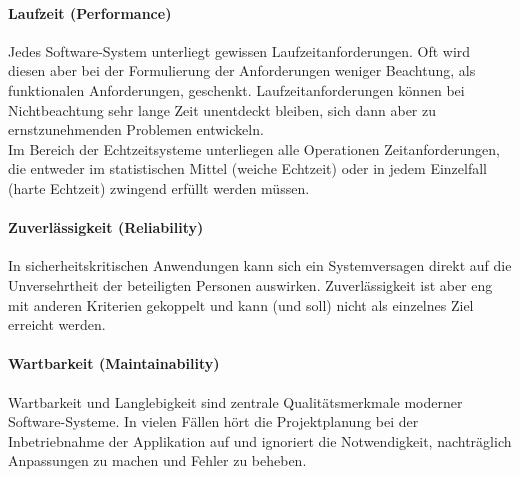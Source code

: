 \paragraph{Laufzeit (Performance)} Jedes Software-System unterliegt gewissen Laufzeitanforderungen. Oft wird diesen aber bei der Formulierung der Anforderungen weniger Beachtung, als funktionalen Anforderungen, geschenkt. Laufzeitanforderungen können bei Nichtbeachtung sehr lange Zeit unentdeckt bleiben, sich dann aber zu ernstzunehmenden Problemen entwickeln.\\
Im Bereich der Echtzeitsysteme unterliegen alle Operationen Zeitanforderungen, die entweder im statistischen Mittel (weiche Echtzeit) oder in jedem Einzelfall (harte Echtzeit) zwingend erfüllt werden müssen\cite{hoffmann_software-qualitat_2013}. 

\paragraph{Zuverlässigkeit (Reliability)} In sicherheitskritischen Anwendungen kann sich ein Systemversagen direkt auf die Unversehrtheit der beteiligten Personen auswirken. Zuverlässigkeit ist aber eng mit anderen Kriterien gekoppelt und kann (und soll) nicht als einzelnes Ziel erreicht werden.

\paragraph{Wartbarkeit (Maintainability)} Wartbarkeit und Langlebigkeit sind zentrale Qualitätsmerkmale moderner Software-Systeme\cite{rombach_design_2009}. In vielen Fällen hört die Projektplanung bei der Inbetriebnahme der Applikation auf und ignoriert die Notwendigkeit, nachträglich Anpassungen zu machen und Fehler zu beheben.

